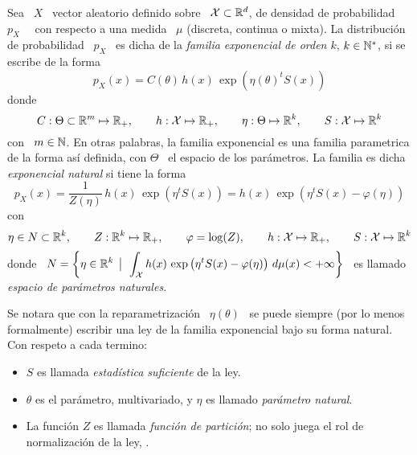 \begin{definicion}\label{Def:MP:FamiliaExponencial}
%
  Sea  \ $X$  \  vector aleatorio  definido  sobre \  $\mathcal{X}  \subset \mathbb{R}^d$,  de
  densidad  de probabilidad  \  $p_X$ \  \ con  respecto  a una  medida \  $\mu$
  (discreta, continua o  mixta). La distribuci\'on de probabilidad  \ $p_X$ \ es
  dicha de  la {\em familia  exponencial de orden  $k$}, $k \in \mathbb{N}^*$,  si se
  escribe de la forma
  \[
  p_X(x) = C(\theta) \, h(x) \, \exp\left( \eta(\theta)^t S(x) \right)
  \]
  donde
  \[
  C:  \Theta \subset  \mathbb{R}^m \mapsto  \mathbb{R}_+,  \qquad h:  \mathcal{X} \mapsto  \mathbb{R}_+,
  \qquad \eta: \Theta \mapsto \mathbb{R}^k, \qquad S: \mathcal{X} \mapsto \mathbb{R}^k
  \]
  con \ $m \in \mathbb{N}$.  En otras palabras, la familia exponencial es una familia
  parametrica  de la  forma as\'i  definida, con  $\Theta$ \  el espacio  de los
  par\'ametros. La familia es dicha {\em exponencial natural} si tiene la forma
  \[
  p_X(x) = \frac{1}{Z(\eta)}  \, h(x) \, \exp\left( \eta^t  S(x) \right) = h(x)
  \, \exp\left( \eta^t S(x) - \varphi(\eta) \right)
  \]
  con
  \[
  \eta \in N \subset \mathbb{R}^k, \qquad Z: \mathbb{R}^k \mapsto \mathbb{R}_+, \qquad \varphi = \log(Z),
  \qquad h: \mathcal{X} \mapsto \mathbb{R}_+, \qquad S: \mathcal{X} \mapsto \mathbb{R}^k
  \]
  donde \  $\displaystyle N = \left\{ \eta \in  \mathbb{R}^k \:\: \big| \:\: \int_{\mathcal{X}} h(x)  \, \exp\left( \eta^t
      S(x) - \varphi(\eta) \right) \, d\mu(x)  < + \infty \right\}$ \ es llamado
  {\em espacio de par\'ametros naturales}.
\end{definicion}
%
Se notara  que con  la reparametrizaci\'on \  $\eta(\theta)$ \ se  puede siempre
(por lo  menos formalmente) escribir una  ley de la familia  exponencial bajo su
forma natural. Con respeto a cada termino:
%
\begin{itemize}
\item $S$ es llamada {\em estad\'istica suficiente} de la ley. 
%
\item  $\theta$  es el  par\'ametro,  multivariado,  y  $\eta$ es  llamado  {\em
    par\'ametro natural}.
%
\item La funci\'on $Z$ es llamada  {\em funci\'on de partici\'on}; no solo juega
  el  rol de  normalizaci\'on  de  la ley,  .
\end{itemize}

